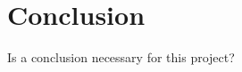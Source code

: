 \documentclass[a4paper,11pt]{article}
\theoremstyle{definition}
\begin{document}
\section{Conclusion}
Is a conclusion necessary for this project?









\printbibliography
\end{document}
